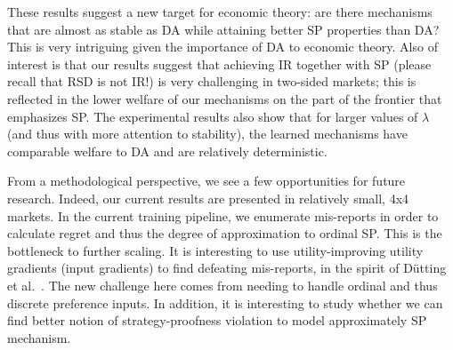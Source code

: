 \documentclass[11pt,letterpaper]{article}
\theoremstyle{definition}
\newcommand{\kibitz}[2]{\ifnum\Comments=1{\color{#1}{#2}}\fi}
\newcommand{\dcp}[1]{\kibitz{orange}{[DCP: #1]}}
\newcommand{\dcpadd}[1]{{#1}}
\begin{document}
 These results  suggest  a new target for economic theory:   are  there mechanisms that
 are almost as stable as DA while attaining better SP properties than DA?  This is very intriguing given the importance of  DA to economic theory. 
 Also of interest is that our results  suggest that achieving IR together with SP (please recall that RSD is not IR!) is very challenging in two-sided markets; this is reflected in the lower welfare of our mechanisms on the part of the frontier that emphasizes SP.
 The experimental results also show that for larger values of $\lambda$ (and thus with more attention to stability),  the learned mechanisms  have comparable welfare to DA and are relatively deterministic.
 
\dcpadd{From a methodological perspective, we see a few opportunities for future research. Indeed, our current results are presented in relatively small, 4x4 markets. In the current training pipeline, we enumerate mis-reports in order to calculate regret and thus the degree of approximation to ordinal SP. This is the bottleneck to further scaling. It is interesting to use  utility-improving utility gradients (input gradients) to find defeating mis-reports, in the spirit of D\"{u}tting et al.~\cite{deep-auction19}. The new challenge here comes from needing to handle ordinal and thus discrete preference inputs.} In addition, it is interesting to study whether we can find better notion of strategy-proofness violation to model approximately SP mechanism. %

\clearpage



\newpage
\appendix

\end{document}
